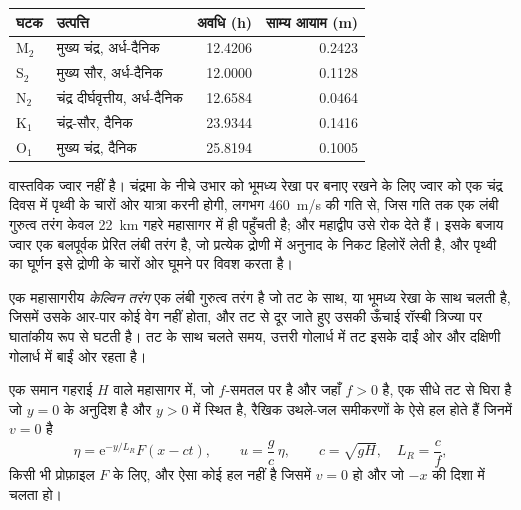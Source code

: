 \begin{center}
\small
\begin{tabular}{llrr}
\hline
घटक & उत्पत्ति & अवधि (\unit{h}) & साम्य आयाम (\unit{m}) \\
\hline
M$_2$ & मुख्य चंद्र, अर्ध-दैनिक & \num{12.4206} & \num{0.2423} \\
S$_2$ & मुख्य सौर, अर्ध-दैनिक & \num{12.0000} & \num{0.1128} \\
N$_2$ & चंद्र दीर्घवृत्तीय, अर्ध-दैनिक & \num{12.6584} & \num{0.0464} \\
K$_1$ & चंद्र-सौर, दैनिक & \num{23.9344} & \num{0.1416} \\
O$_1$ & मुख्य चंद्र, दैनिक & \num{25.8194} & \num{0.1005} \\
\hline
\end{tabular}
\end{center}

वास्तविक ज्वार  नहीं है। चंद्रमा के नीचे उभार को भूमध्य रेखा पर बनाए रखने के लिए
ज्वार को एक चंद्र दिवस में पृथ्वी के चारों ओर यात्रा करनी होगी,
लगभग \qty{460}{m/s} की गति से, जिस गति तक एक लंबी गुरुत्व तरंग केवल
\qty{22}{km} गहरे महासागर में ही पहुँचती है; और महाद्वीप उसे रोक देते हैं।
इसके बजाय ज्वार एक बलपूर्वक प्रेरित लंबी तरंग है, जो प्रत्येक द्रोणी में अनुनाद के निकट हिलोरें लेती है, और
पृथ्वी का घूर्णन इसे द्रोणी के चारों ओर घूमने पर विवश करता है।

\begin{definition}[केल्विन तरंग]\label{def:b3:ocean-dynamics:kelvin-wave}
एक महासागरीय \emph{केल्विन तरंग} एक लंबी गुरुत्व तरंग है
जो तट के साथ, या भूमध्य रेखा के साथ चलती है, जिसमें उसके आर-पार कोई वेग नहीं होता,
और तट से दूर जाते हुए उसकी ऊँचाई रॉस्बी
त्रिज्या पर घातांकीय रूप से घटती है। तट के साथ चलते समय, उत्तरी गोलार्ध में
तट इसके दाईं ओर और दक्षिणी गोलार्ध में बाईं ओर रहता है।
\end{definition}

\begin{theorem}[तटीय केल्विन तरंग]\label{thm:b3:ocean-dynamics:kelvin}
एक समान गहराई $H$ वाले महासागर में, जो $f$-समतल पर है और जहाँ $f > 0$ है,
एक सीधे तट से घिरा है जो $y = 0$ के अनुदिश है और $y > 0$ में स्थित है, रैखिक उथले-जल
समीकरणों के ऐसे हल होते हैं जिनमें $v = 0$ है
\[
\eta = \mathrm e^{-y/L_R}F(x - ct),\qquad u = \frac{g}{c}\,\eta,\qquad
c = \sqrt{gH},\quad L_R = \frac{c}{f},
\]
किसी भी प्रोफ़ाइल $F$ के लिए, और ऐसा कोई हल नहीं है जिसमें $v = 0$ हो और जो
$-x$ की दिशा में चलता हो।
\end{theorem}

